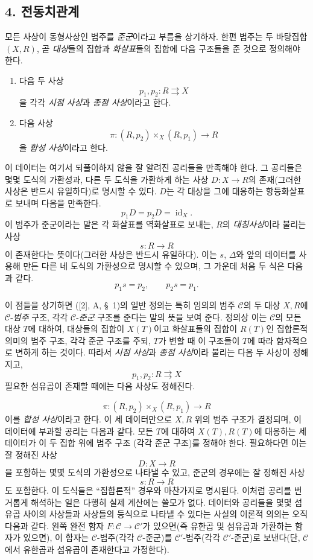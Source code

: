 \documentclass[11pt,twoside,openany]{book}
\numberwithin{equation}{section}
\newcommand{\sourceunit}{front}
\newcommand{\src}[1]{%
  \phantomsection\hypertarget{src:\sourceunit:#1}{}%
  \marginpar{\raggedleft\footnotesize\sffamily #1}%
}
\theoremstyle{plain}
\theoremstyle{definition}
\theoremstyle{remark}
\begin{document}
\subsection*{4. 전동치관계}

모든 사상이 동형사상인 범주를 \emph{준군}이라고 부름을 상기하자. 한편
범주는 두 바탕집합 $(X,R)$, 곧 \emph{대상}들의 집합과 \emph{화살표}들의
집합에 다음 구조들을 준 것으로 정의해야 한다.
\src{106}
\begin{enumerate}
\item[(i)] 다음 두 사상
\[
  p_1,p_2:R\rightrightarrows X
\]
을 각각 \emph{시점 사상}과 \emph{종점 사상}이라고 한다.

\item[(ii)] 다음 사상
\[
  \pi:(R,p_2)\times_X(R,p_1)\longrightarrow R
\]
을 \emph{합성 사상}이라고 한다.
\end{enumerate}
이 데이터는 여기서 되풀이하지 않을 잘 알려진 공리들을 만족해야 한다.
그 공리들은 몇몇 도식의 가환성과, 다른 두 도식을 가환하게 하는 사상
$D:X\to R$의 존재(그러한 사상은 반드시 유일하다)로 명시할 수 있다.
$D$는 각 대상을 그에 대응하는 항등화살표로 보내며 다음을 만족한다.
\[
  p_1D=p_2D=\operatorname{id}_X.
\]
이 범주가 준군이라는 말은 각 화살표를 역화살표로 보내는, $R$의
\emph{대칭사상}이라 불리는 사상
\[
  s:R\longrightarrow R
\]
이 존재한다는 뜻이다(그러한 사상은 반드시 유일하다). 이는 $s$,
$\Delta$와 앞의 데이터를 사용해 만든 다른 네 도식의 가환성으로 명시할
수 있으며, 그 가운데 처음 두 식은 다음과 같다.
\[
  p_1s=p_2,\qquad p_2s=p_1.
\]

이 점들을 상기하면 ([2], A, \S~1)의 일반 정의는 특히 임의의 범주
$\mathcal C$의 두 대상 $X,R$에 $\mathcal C$-\emph{범주} 구조, 각각
$\mathcal C$-\emph{준군} 구조를 준다는 말의 뜻을 보여 준다. 정의상 이는
$\mathcal C$의 모든 대상 $T$에 대하여, 대상들의 집합이 $X(T)$이고
화살표들의 집합이 $R(T)$인 집합론적 의미의 범주 구조, 각각 준군 구조를
주되, $T$가 변할 때 이 구조들이 $T$에 따라
\guillemotleft 함자적으로 변하게\guillemotright{} 하는 것이다. 따라서
\emph{시점 사상}과 \emph{종점 사상}이라 불리는 다음 두 사상이 정해지고,
\[
  p_1,p_2:R\rightrightarrows X
\]
필요한 섬유곱이 존재할 때에는 다음 사상도 정해진다.
\src{107}
\[
  \pi:(R,p_2)\times_X(R,p_1)\longrightarrow R
\]
이를 \emph{합성 사상}이라고 한다. 이 세 데이터만으로 $X,R$ 위의 범주
구조가 결정되며, 이 데이터에 부과할 공리는 다음과 같다. 모든 $T$에
대하여 $X(T),R(T)$에 대응하는 세 데이터가 이 두 집합 위에 범주 구조
(각각 준군 구조)를 정해야 한다. 필요하다면 이는 잘 정해진 사상
\[
  D:X\longrightarrow R
\]
을 포함하는 몇몇 도식의 가환성으로 나타낼 수 있고, 준군의 경우에는 잘
정해진 사상
\[
  s:R\longrightarrow R
\]
도 포함한다. 이 도식들은 ``집합론적'' 경우와 마찬가지로 명시된다. 이처럼
공리를 번거롭게 해석하는 일은 다행히 실제 계산에는 쓸모가 없다. 데이터와
공리들을 몇몇 섬유곱 사이의 사상들과 사상들의 등식으로 나타낼 수 있다는
사실의 이론적 의의는 오직 다음과 같다. 왼쪽 완전 함자
$F:\mathcal C\to\mathcal C'$가 있으면(즉 유한곱 및 섬유곱과 가환하는
함자가 있으면), 이 함자는 $\mathcal C$-범주(각각 $\mathcal C$-준군)를
$\mathcal C'$-범주(각각 $\mathcal C'$-준군)로 보낸다(단, $\mathcal
C$에서 유한곱과 섬유곱이 존재한다고 가정한다).
\end{document}
